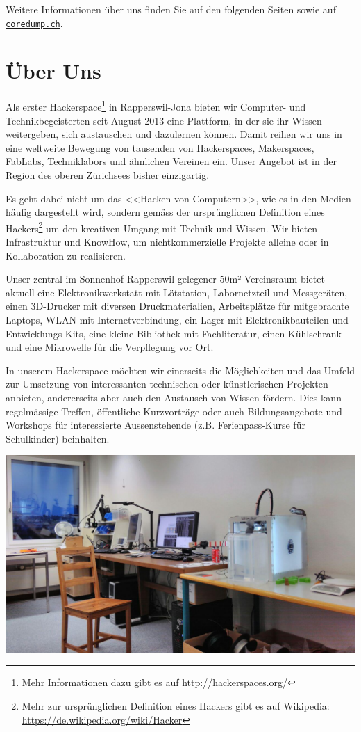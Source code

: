 \documentclass[10pt,a4paper,parskip,fleqn]{scrartcl}
\begin{document}
Weitere Informationen über uns finden Sie auf den folgenden Seiten sowie auf
\href{https://www.coredump.ch/}{\texttt{coredump.ch}}.

\newpage

\section{Über Uns}

Als erster Hackerspace\footnote{Mehr Informationen dazu gibt es auf
\url{http://hackerspaces.org/}} in Rapperswil-Jona bieten wir Computer- und
Technikbegeisterten seit August 2013 eine Plattform, in der sie ihr Wissen
weitergeben, sich austauschen und dazulernen können. Damit reihen wir uns in
eine weltweite Bewegung von tausenden von Hackerspaces, Makerspaces, FabLabs,
Techniklabors und ähnlichen Vereinen ein. Unser Angebot ist in der Region des
oberen Zürichsees bisher einzigartig.

Es geht dabei nicht um das <<Hacken von Computern>>, wie es in den Medien häufig
dargestellt wird, sondern gemäss der ursprünglichen Definition eines
Hackers\footnote{Mehr zur ursprünglichen Definition eines Hackers gibt es auf
Wikipedia: \url{https://de.wikipedia.org/wiki/Hacker}} um den kreativen Umgang
mit Technik und Wissen. Wir bieten Infrastruktur und KnowHow, um
nichtkommerzielle Projekte alleine oder in Kollaboration zu realisieren.

Unser zentral im Sonnenhof Rapperswil gelegener 50m²-Vereinsraum bietet aktuell
eine Elektronikwerkstatt mit Lötstation, Labornetzteil und Messgeräten, einen
3D-Drucker mit diversen Druckmaterialien, Arbeitsplätze für mitgebrachte
Laptops, WLAN mit Internetverbindung, ein Lager mit Elektronikbauteilen und
Entwicklungs-Kits, eine kleine Bibliothek mit Fachliteratur, einen Kühlschrank
und eine Mikrowelle für die Verpflegung vor Ort.

In unserem Hackerspace möchten wir einerseits die Möglichkeiten und das Umfeld
zur Umsetzung von interessanten technischen oder künstlerischen Projekten
anbieten, andererseits aber auch den Austausch von Wissen fördern. Dies kann
regelmässige Treffen, öffentliche Kurzvorträge oder auch Bildungsangebote und
Workshops für interessierte Aussenstehende (z.B. Ferienpass-Kurse für
Schulkinder) beinhalten.

\includegraphics[width=\textwidth]{img/raum.jpg}
\end{document}
